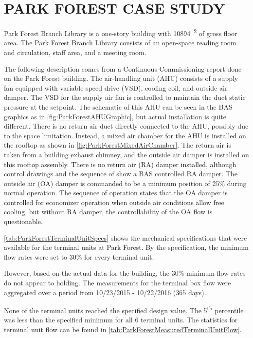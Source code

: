 \chapter{\texorpdfstring{\MakeUppercase{Park Forest Case Study}}{Park Forest Case Study}}

Park Forest Branch Library is a one-story building with
\SI{10894}{\feet\squared} of gross floor area. The Park Forest Branch
Library consists of an open-space reading room and circulation, staff
area, and a meeting room.

The following description comes from a Continuous Commissioning report
done on the Park Forest building. The air-handling unit (AHU) consists
of a supply fan equipped with variable speed drive (VSD), cooling coil,
and outside air damper. The VSD for the supply air fan is controlled to
maintain the duct static pressure at the setpoint. The schematic of this AHU can
be seen in the BAS graphics as in \figref{}
\ref{fig:ParkForestAHUGraphic}, but actual installation is
quite different. There is no return air duct directly connected to the
AHU, possibly due to the space limitation. Instead, a mixed air chamber
for the AHU is installed on the rooftop as shown in \figref{}
\ref{fig:ParkForestMixedAirChamber}. The return
air is taken from a building exhaust chimney, and the outside air damper
is installed on this rooftop assembly. There is no return air (RA)
damper installed, although control drawings and the sequence of show a
BAS controlled RA damper. The outside air (OA) damper is commanded to be
a minimum position of 25\% during normal operation. The sequence of
operation states that the OA damper is controlled for economizer
operation when outside air conditions allow free cooling, but without
RA damper, the controllability of the OA flow is questionable.

\tableref{} \ref{tab:ParkForestTerminalUnitSpecs} shows the
mechanical specifications that were available for the terminal units at
Park Forest. By the specification, the minimum flow rates were set to
30\% for every terminal unit. 

However, based on the actual data for the building, the 30\% minimum
flow rates do not appear to holding. The measurements for the terminal
box flow were aggregated over a period from 10/23/2015 - 10/22/2016
(365 days). 

None of the terminal units reached the specified design value. The
5\textsuperscript{th} percentile was less than the specified minimum for
all 6 terminal units. The statistics for terminal unit flow can be found in 
\tableref{} \ref{tab:ParkForestMeasuredTerminalUnitFlow}. 



